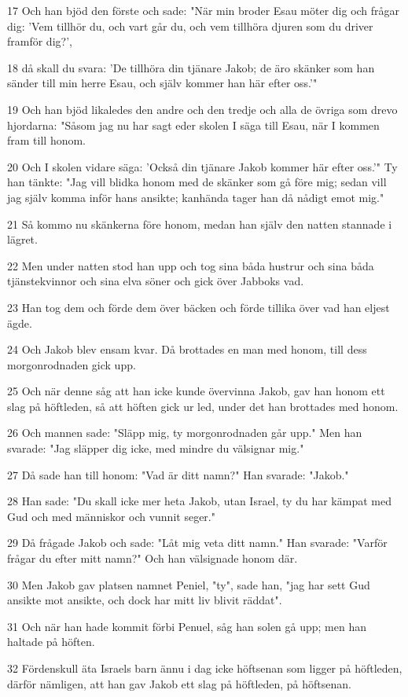 \par 17 Och han bjöd den förste och sade: "När min broder Esau möter dig och frågar dig: 'Vem tillhör du, och vart går du, och vem tillhöra djuren som du driver framför dig?',
\par 18 då skall du svara: 'De tillhöra din tjänare Jakob; de äro skänker som han sänder till min herre Esau, och själv kommer han här efter oss.'"
\par 19 Och han bjöd likaledes den andre och den tredje och alla de övriga som drevo hjordarna: "Såsom jag nu har sagt eder skolen I säga till Esau, när I kommen fram till honom.
\par 20 Och I skolen vidare säga: 'Också din tjänare Jakob kommer här efter oss.'" Ty han tänkte: "Jag vill blidka honom med de skänker som gå före mig; sedan vill jag själv komma inför hans ansikte; kanhända tager han då nådigt emot mig."
\par 21 Så kommo nu skänkerna före honom, medan han själv den natten stannade i lägret.
\par 22 Men under natten stod han upp och tog sina båda hustrur och sina båda tjänstekvinnor och sina elva söner och gick över Jabboks vad.
\par 23 Han tog dem och förde dem över bäcken och förde tillika över vad han eljest ägde.
\par 24 Och Jakob blev ensam kvar. Då brottades en man med honom, till dess morgonrodnaden gick upp.
\par 25 Och när denne såg att han icke kunde övervinna Jakob, gav han honom ett slag på höftleden, så att höften gick ur led, under det han brottades med honom.
\par 26 Och mannen sade: "Släpp mig, ty morgonrodnaden går upp." Men han svarade: "Jag släpper dig icke, med mindre du välsignar mig."
\par 27 Då sade han till honom: "Vad är ditt namn?" Han svarade: "Jakob."
\par 28 Han sade: "Du skall icke mer heta Jakob, utan Israel, ty du har kämpat med Gud och med människor och vunnit seger."
\par 29 Då frågade Jakob och sade: "Låt mig veta ditt namn." Han svarade: "Varför frågar du efter mitt namn?" Och han välsignade honom där.
\par 30 Men Jakob gav platsen namnet Peniel, "ty", sade han, "jag har sett Gud ansikte mot ansikte, och dock har mitt liv blivit räddat".
\par 31 Och när han hade kommit förbi Penuel, såg han solen gå upp; men han haltade på höften.
\par 32 Fördenskull äta Israels barn ännu i dag icke höftsenan som ligger på höftleden, därför nämligen, att han gav Jakob ett slag på höftleden, på höftsenan.

